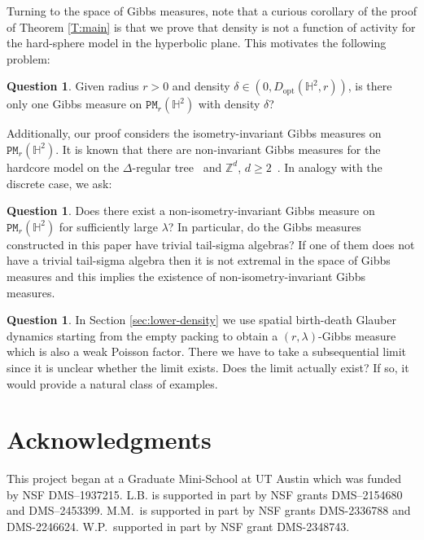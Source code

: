 \documentclass[11pt]{amsart}
\theoremstyle{definition}
\newtheorem{question}[theorem]{Question}
\theoremstyle{remark}
\renewcommand{\H}{\mathbb{H}}
\newcommand{\cP}{\mathtt{PM}}
\newcommand{\opt}{\operatorname{opt}}
\newcommand{\lam}{\lambda}
\begin{document}
Turning to the space of Gibbs measures, note that a curious corollary of the proof of Theorem \ref{T:main} is that we prove that density is not a function of activity for the hard-sphere model in the hyperbolic plane. This motivates the following problem: 
\begin{question}
    Given radius $r>0$ and density $\delta \in (0,D_{\opt}(\H^2,r))$, is there only one Gibbs measure on $\cP_r(\H^2)$ with density $\delta$? 
\end{question}

Additionally, our proof considers the isometry-invariant Gibbs measures on $\cP_r(\H^2)$.  It is known that there are non-invariant Gibbs measures for the hardcore model on the $\Delta$-regular tree~\cite{spitzer1975markov,kelly1985stochastic} and $\mathbb Z^d$, $d \ge 2$~\cite{dobrushin1968problem}.  In analogy with the discrete case, we ask: 
\begin{question}
    Does there exist a non-isometry-invariant Gibbs measure on $\cP_r(\H^2)$ for sufficiently large $\lam$? In particular, do the Gibbs measures constructed in this paper have trivial tail-sigma algebras? If one of them does not have a trivial tail-sigma algebra then it is not extremal in the space of Gibbs measures and this implies the existence of non-isometry-invariant Gibbs measures.
    
\end{question}

\begin{question}
    In Section \ref{sec:lower-density} we use  spatial birth-death Glauber dynamics starting from the empty packing to obtain a $(r,\lam)$-Gibbs measure which is also a weak Poisson factor. There we have to take a subsequential limit since it is unclear whether the limit exists.  Does the limit actually exist? If so, it would provide a natural class of examples. 
\end{question}

\section*{Acknowledgments}

This project began at a Graduate Mini-School at UT Austin which was funded by NSF DMS--1937215. L.B. is supported in part by NSF grants DMS--2154680 and DMS--2453399.
M.M.\ is supported in part by NSF grants DMS-2336788 and DMS-2246624.  W.P.\ supported in part by NSF grant DMS-2348743. 




\end{document}

